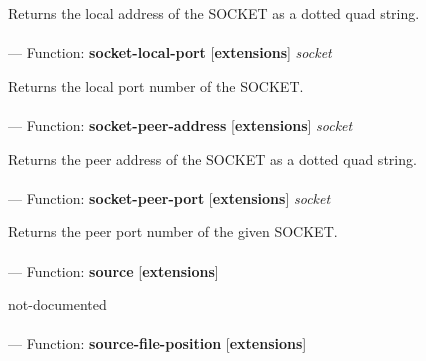 \begin{adjustwidth}{5em}{5em}
Returns the local address of the SOCKET as a dotted quad string.
\end{adjustwidth}

\paragraph{}
\label{EXTENSIONS:SOCKET-LOCAL-PORT}
--- Function: \textbf{socket-local-port} [\textbf{extensions}] \textit{socket}

\begin{adjustwidth}{5em}{5em}
Returns the local port number of the SOCKET.
\end{adjustwidth}

\paragraph{}
\label{EXTENSIONS:SOCKET-PEER-ADDRESS}
--- Function: \textbf{socket-peer-address} [\textbf{extensions}] \textit{socket}

\begin{adjustwidth}{5em}{5em}
Returns the peer address of the SOCKET as a dotted quad string.
\end{adjustwidth}

\paragraph{}
\label{EXTENSIONS:SOCKET-PEER-PORT}
--- Function: \textbf{socket-peer-port} [\textbf{extensions}] \textit{socket}

\begin{adjustwidth}{5em}{5em}
Returns the peer port number of the given SOCKET.
\end{adjustwidth}

\paragraph{}
\label{EXTENSIONS:SOURCE}
--- Function: \textbf{source} [\textbf{extensions}] \textit{}

\begin{adjustwidth}{5em}{5em}
not-documented
\end{adjustwidth}

\paragraph{}
\label{EXTENSIONS:SOURCE-FILE-POSITION}
--- Function: \textbf{source-file-position} [\textbf{extensions}] \textit{}

